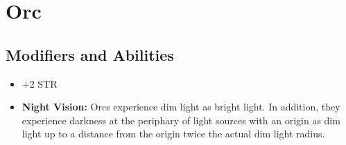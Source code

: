 \section{Orc}\label{orc}

\subsection*{Modifiers and Abilities}
\begin{itemize}
    \item +2 STR
    \item \textbf{Night Vision:} Orcs experience dim light as bright light. In
        addition, they experience darkness at the periphary of light sources
        with an origin as dim light up to a distance from the origin twice the
        actual dim light radius.
\end{itemize}
